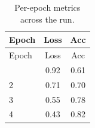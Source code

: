\begin{longtable}{lcc}
\caption{Per-epoch metrics across the run.}\label{tab:epochs} \\
\toprule
Epoch & Loss & Acc \\
\midrule
\endfirsthead
\toprule
Epoch & Loss & Acc \\
\midrule
\endhead
\bottomrule
\endfoot
1 & 0.92 & 0.61 \\
2 & 0.71 & 0.70 \\
3 & 0.55 & 0.78 \\
4 & 0.43 & 0.82 \\
\end{longtable}
